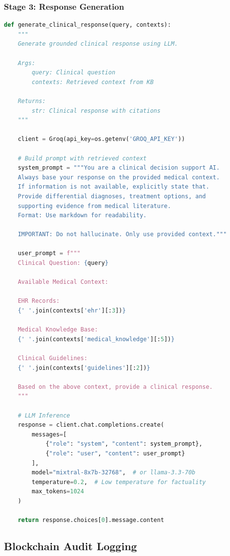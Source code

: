 \documentclass[12pt,singleside,a4paper]{article}
\begin{document}
\subsubsection{Stage 3: Response Generation}

\begin{lstlisting}[caption=LLM Response Generation,language=Python]
def generate_clinical_response(query, contexts):
    """
    Generate grounded clinical response using LLM.
    
    Args:
        query: Clinical question
        contexts: Retrieved context from KB
    
    Returns:
        str: Clinical response with citations
    """
    
    client = Groq(api_key=os.getenv('GROQ_API_KEY'))
    
    # Build prompt with retrieved context
    system_prompt = """You are a clinical decision support AI.
    Always base your response on the provided medical context.
    If information is not available, explicitly state that.
    Provide differential diagnoses, treatment options, and 
    supporting evidence from medical literature.
    Format: Use markdown for readability.
    
    IMPORTANT: Do not hallucinate. Only use provided context."""
    
    user_prompt = f"""
    Clinical Question: {query}
    
    Available Medical Context:
    
    EHR Records:
    {' '.join(contexts['ehr'][:3])}
    
    Medical Knowledge Base:
    {' '.join(contexts['medical_knowledge'][:5])}
    
    Clinical Guidelines:
    {' '.join(contexts['guidelines'][:2])}
    
    Based on the above context, provide a clinical response.
    """
    
    # LLM Inference
    response = client.chat.completions.create(
        messages=[
            {"role": "system", "content": system_prompt},
            {"role": "user", "content": user_prompt}
        ],
        model="mixtral-8x7b-32768",  # or llama-3.3-70b
        temperature=0.2,  # Low temperature for factuality
        max_tokens=1024
    )
    
    return response.choices[0].message.content
\end{lstlisting}

\subsection{Blockchain Audit Logging}
\end{document}
